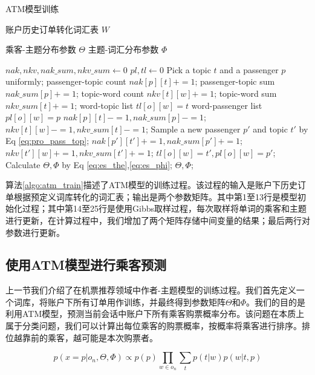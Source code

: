 \begin{algorithm}
\caption{ATM模型训练}
\label{algo:atm_train}
\begin{algorithmic}[1]
\Require
\Statex 账户历史订单转化词汇表 $W$

\Ensure 
\Statex 乘客-主题分布参数 $\Theta$
\Statex 主题-词汇分布参数 $\Phi$

\State $nak , nkv, nak\_sum, nkv\_sum \gets 0$
\State $pl , tl \gets 0$
\State Pick a topic $t$ and a passenger $p$ uniformly;
\State passenger-topic count $nak[p][t] += 1$;
\State passenger-topic sum $nak\_sum[p] += 1$;
\State topic-word count $nkv[t][w] += 1$;
\State topic-word sum $nkv\_sum[t] += 1$;
\State word-topic list $tl[o][w] = t$
\State word-passenger list $pl[o][w] = p$
\EndFor
\EndFor
{}
\State $nak[p][t] -= 1, nak\_sum[p] -= 1$;
\State $nkv[t][w] -= 1, nkv\_sum[t] -= 1$;
\State Sample a new passenger $p'$ and topic $t'$ by Eq \ref{eq:pro_pass_top};
\State $nak[p'][t'] += 1, nak\_sum[p'] += 1$;
\State $nkv[t'][w] += 1, nkv\_sum[t'] += 1$;
\State $tl[o][w] = t', pl[o][w] = p'$;
\EndFor
\EndFor
\EndWhile
\State Calculate $\Theta,\Phi$ by Eq \ref{eq:es_the},\ref{eq:es_phi};
\State \Return $\Theta,\Phi$;
\end{algorithmic} 
\end{algorithm}

算法\ref{algo:atm_train}描述了ATM模型的训练过程。该过程的输入是账户下历史订单根据预定义词库转化的词汇表；输出是两个参数矩阵。其中第1至13行是模型初始化过程；其中第14至25行是使用Gibbs取样过程，每次取样将单词的乘客和主题进行更新，在计算过程中，我们增加了两个矩阵存储中间变量的结果；最后两行对参数进行更新。

\subsection{使用ATM模型进行乘客预测}

上一节我们介绍了在机票推荐领域中作者-主题模型的训练过程。我们首先定义一个词库，将账户下所有订单用作训练，并最终得到参数矩阵$\Theta$和$\Phi$。我们的目的是利用ATM模型，预测当前会话中账户下所有乘客购票概率分布。该问题在本质上属于分类问题，我们可以计算出每位乘客的购票概率，按概率将乘客进行排序。排位越靠前的乘客，越可能是本次购票者。

\begin{equation}
\label{eq:pred_pass}
p(x=p|o_n,\Theta,\Phi) \propto p(p)\prod_{w \in o_n}\sum_t p(t|w)p(w|t,p)
\end{equation}

